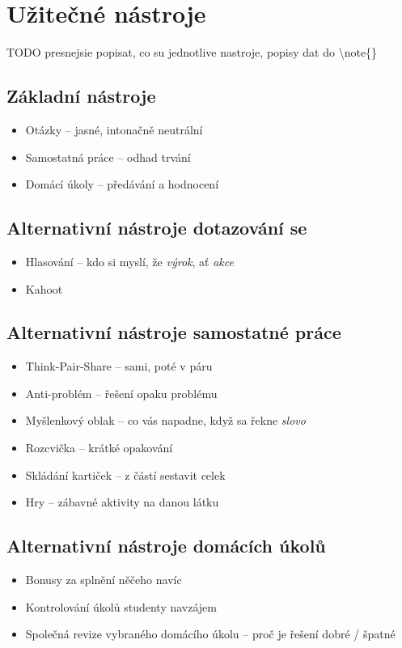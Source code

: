 \documentclass[twoside,openany,10pt]{book}
\begin{document}
\chapter*{Užitečné nástroje}

TODO presnejsie popisat, co su jednotlive nastroje, popisy dat do \textbackslash{}note\{\}

\section*{Základní nástroje}
\begin{itemize}
\item Otázky -- jasné, intonačně neutrální
\item Samostatná práce -- odhad trvání
\item Domácí úkoly -- předávání a hodnocení
\end{itemize}

\section*{Alternativní nástroje dotazování se}
\begin{itemize}
\item Hlasování -- kdo si myslí, že \textit{výrok}, ať \textit{akce}
\item Kahoot
\end{itemize}

\section*{Alternativní nástroje samostatné práce}
\begin{itemize}
\item Think-Pair-Share -- sami, poté v páru
\item Anti-problém -- řešení opaku problému
\item Myšlenkový oblak -- co vás napadne, když sa řekne \textit{slovo}
\item Rozcvička -- krátké opakování
\item Skládání kartiček -- z částí sestavit celek
\item Hry -- zábavné aktivity na danou látku
\end{itemize}

\section*{Alternativní nástroje domácích úkolů}
\begin{itemize}
\item Bonusy za splnění něčeho navíc
\item Kontrolování úkolů studenty navzájem
\item Společná revize vybraného domácího úkolu -- proč je řešení dobré / špatné
\end{itemize}
\end{document}
